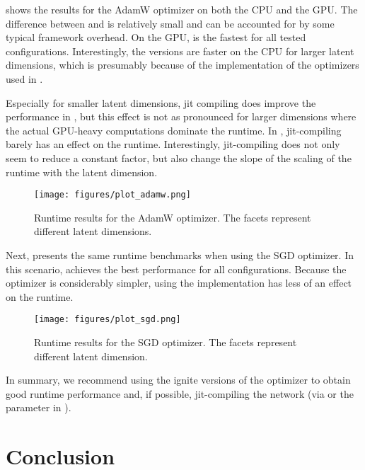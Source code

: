 \documentclass[article]{jss}
\theoremstyle{definition}
\begin{document}
 shows the results for the AdamW optimizer on both the CPU and the GPU.
The difference between \torch{} and \mlrttorch{} is relatively small and can be accounted for by some typical framework overhead.
On the GPU, \pytorch{} is the fastest for all tested configurations.
Interestingly, the \rlang{} versions are faster on the CPU for larger latent dimensions, which is presumably because of the \libtorch{} implementation of the optimizers used in \rlang{}.

Especially for smaller latent dimensions, jit compiling does improve the performance in \rlang{}, but this effect is not as pronounced for larger dimensions where the actual GPU-heavy computations dominate the runtime.
In \pytorch{}, jit-compiling barely has an effect on the runtime.
Interestingly, jit-compiling does not only seem to reduce a constant factor, but also change the slope of the scaling of the runtime with the latent dimension.


\begin{figure}[h]
    \centering
    \texttt{[image: figures/plot\_adamw.png]}
    \caption{Runtime results for the AdamW optimizer. The facets represent different latent dimensions.}
    \label{fig:adamw-benchmark}
\end{figure}

Next,  presents the same runtime benchmarks when using the SGD optimizer.
In this scenario, \pytorch{} achieves the best performance for all configurations.
Because the optimizer is considerably simpler, using the \libtorch{} implementation has less of an effect on the runtime.

\begin{figure}[h]
    \centering
    \texttt{[image: figures/plot\_sgd.png]}
    \caption{Runtime results for the SGD optimizer. The facets represent different latent dimension.}
    \label{fig:sgd-benchmark}
\end{figure}

In summary, we recommend using the ignite versions of the optimizer to obtain good runtime performance and, if possible, jit-compiling the network (via  or the  parameter in \mlrttorch{}).

\section{Conclusion}\label{sec:conclusion}
\end{document}
